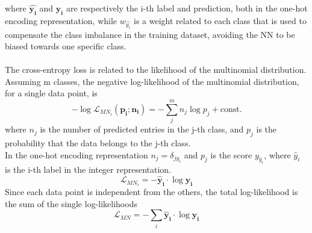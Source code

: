 where $\bm{\hat{y_i}}$ and $\bm{y_i}$ are respectively the i-th label and prediction, both in the one-hot encoding representation, while $w_{\hat{y_i}}$ is a weight related to each class that is used to compensate the class imbalance in the training dataset, avoiding the NN to be biased towards one specific class.\\
\\
The cross-entropy loss is related to the likelihood of the multinomial distribution. Assuming m classes, the negative log-likelihood of the multinomial distribution, for a single data point, is\\
\begin{equation}
    -\log \mathcal{L}_{MN_{i}}(\bm{p_i};\bm{n_i})=-\sum_j^m n_j \log p_j + \text{const.}
\end{equation}
where $n_j$ is the number of predicted entries in the j-th class, and $p_j$ is the probability that the data belongs to the j-th class.\\
In the one-hot encoding representation $n_j=\delta_{j\hat{y}_i}$ and $p_j$ is the score ${y}_{\hat{y}_i}$, where $\hat{y}_i$ is the i-th label in the integer representation.
\begin{equation}
    \mathcal{L}_{MN_{i}}=-\bm{\hat{y}_i} \cdot \log \bm{y_i}
\end{equation}
Since each data point is independent from the others, the total log-likelihood is the sum of the single log-likelihoods
\begin{equation}
    \mathcal{L}_{MN}=-\sum_i \bm{\hat{y}_i} \cdot \log \bm{y_i}
\end{equation}


